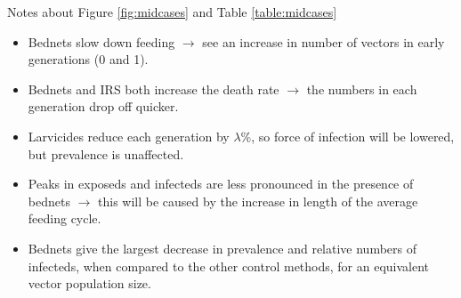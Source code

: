 \documentclass[a4paper,12pt]{article}
\begin{document}
Notes about Figure \ref{fig:midcases} and Table \ref{table:midcases}
\begin{itemize}
\item Bednets slow down feeding $\rightarrow$ see an increase in number of vectors in early generations (0 and 1).
\item Bednets and IRS both increase the death rate $\rightarrow$ the numbers in each generation drop off quicker.
\item Larvicides reduce each generation by $\lambda$\%, so force of infection will be lowered, but prevalence is unaffected.
\item Peaks in exposeds and infecteds are less pronounced in the presence of bednets $\rightarrow$ this will be caused by the increase in length of the average feeding cycle.
\item Bednets give the largest decrease in prevalence and relative numbers of infecteds, when compared to the other control methods, for an equivalent vector population size.
\end{itemize}

%


\end{document}
